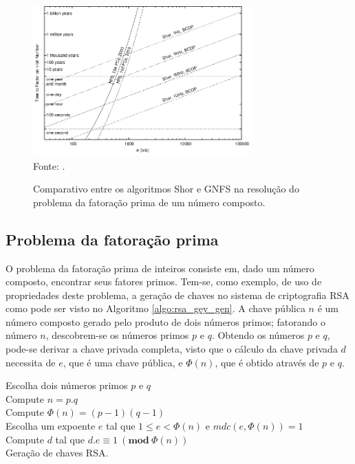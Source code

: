     \begin{figure}[htb!]
        \centering
        \caption{Comparativo entre os algoritmos Shor e \ac{GNFS} na resolução do problema da fatoração prima de um número composto.}
        \includegraphics[width=0.75\textwidth]{Figuras/shor_vs_gnfs.png}\\
        \footnotesize{Fonte: \cite{shor_vs_gnfs}.}
        \label{fig:shor_vs_gnfs}
    \end{figure}

        \subsection{Problema da fatoração prima}
        \label{sec:problema_fatoracao_prima}
            O problema da fatoração prima de inteiros consiste em, dado um número composto, encontrar seus fatores primos. Tem-se, como exemplo, de uso de propriedades deste problema, a geração de chaves no sistema de criptografia RSA como pode ser visto no Algoritmo \ref{algo:rsa_gey_gen}. A chave pública $n$ é um número composto gerado pelo produto de dois números primos; fatorando o número $n$, descobrem-se os números primos $p$ e $q$. Obtendo os números $p$ e $q$, pode-se derivar a chave privada completa, visto que o cálculo da chave privada $d$ necessita de $e$, que é uma chave pública, e $\Phi(n)$, que é obtido através de $p$ e $q$.

            \begin{algorithm}[!htbp]
                \SetAlgoLined
                Escolha dois números primos $p$ e $q$\\
                Compute $n = p.q$\\
                Compute $\Phi(n) = (p - 1)(q - 1)$\\
                Escolha um expoente $e$ tal que $1 \le e < \Phi(n)$ e $mdc(e,\Phi(n))=1$\\
                Compute $d$ tal que $d.e \equiv 1\ (\textbf{mod}\ \Phi(n))$\\
                \caption{Geração de chaves RSA.}
                \label{algo:rsa_gey_gen}
            \end{algorithm}

